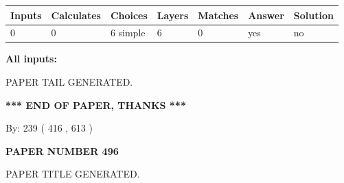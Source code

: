 \documentclass{ctexart}
\begin{document}
 
   
   
   
   
\noindent\begin{tabular}{|l|l|l|l|l|l|l|}
 \hline
Inputs & Calculates & Choices & Layers & Matches & Answer & Solution \\ \hline
 0  & 
 0  & 
 6
  simple  
  & 
 6  & 
 0  & 
  yes & 
  no 
  \\ \hline
 \end{tabular}
   
   
   
   
\noindent{}
   
   
   
   
\noindent\vspace{0.1in}\hspace{-0.08in} {\textbf{\Large{All inputs: }}}
   
   
   
   
   
   
 \vspace{0.2in}
 
   
   
\vspace{2.0in} PAPER TAIL GENERATED.
   
   
   
   
\vspace{1.0in} 
{\textbf{\large{ *** END OF PAPER, THANKS *** }}} 
   
   
\hspace{1.0in} By: 
 239 ( 416 ,  613 )
   
   
   
   
\newpage 
\setcounter{page}{ 
   496001 } 
   
   
   
   
 {\textbf{ \Large{ PAPER NUMBER  496  }}}
   
   
\vspace{0.2in}
   
   
   
   
   
   
   
   
 \vspace{0.2in}
 
 
 
 
   
   
 PAPER TITLE GENERATED.
   
\end{document}
